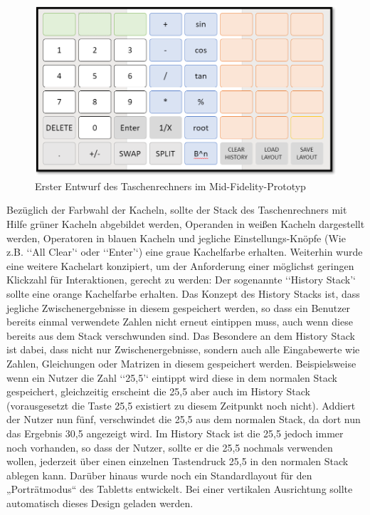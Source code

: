 \begin{figure}[!h]
	\includegraphics[scale=1]{img/erster-entwurf-mid-fidelty-prototyp}
	\caption[Erster Entwurf des Taschenrechners im Mid-Fidelity-Prototyp]{Erster Entwurf des Taschenrechners im Mid-Fidelity-Prototyp\footnotemark}
\end{figure}

Bezüglich der Farbwahl der Kacheln, sollte der Stack des Taschenrechners mit Hilfe grüner Kacheln abgebildet werden, Operanden in weißen Kacheln dargestellt werden, Operatoren in blauen Kacheln und jegliche Einstellungs-Knöpfe (Wie z.B. ‘‘All Clear’‘ oder ‘‘Enter’‘) eine graue Kachelfarbe erhalten. Weiterhin wurde eine weitere Kachelart konzipiert, um der Anforderung einer möglichst geringen Klickzahl für Interaktionen, gerecht zu werden: Der sogenannte ‘‘History Stack’‘ sollte eine orange Kachelfarbe erhalten. Das Konzept des History Stacks ist, dass jegliche Zwischenergebnisse in diesem gespeichert werden, so dass ein Benutzer bereits einmal verwendete Zahlen nicht erneut eintippen muss, auch wenn diese bereits aus dem Stack verschwunden sind. Das Besondere an dem History Stack ist dabei, dass nicht nur Zwischenergebnisse, sondern auch alle Eingabewerte wie Zahlen, Gleichungen oder Matrizen in diesem gespeichert werden. Beispielsweise wenn ein Nutzer die Zahl ‘‘25,5’‘ eintippt wird diese in dem normalen Stack gespeichert, gleichzeitig erscheint die 25,5 aber auch im History Stack (vorausgesetzt die Taste 25,5 existiert zu diesem Zeitpunkt noch nicht). Addiert der Nutzer nun fünf, verschwindet die 25,5 aus dem normalen Stack, da dort nun das Ergebnis 30,5 angezeigt wird. Im History Stack ist die 25,5 jedoch immer noch vorhanden, so dass der Nutzer, sollte er die 25,5 nochmals verwenden wollen, jederzeit über einen einzelnen Tastendruck 25,5 in den normalen Stack ablegen kann. Darüber hinaus wurde noch ein Standardlayout für den „Porträtmodus“ des Tabletts entwickelt. Bei einer vertikalen Ausrichtung sollte automatisch dieses Design geladen werden. 

